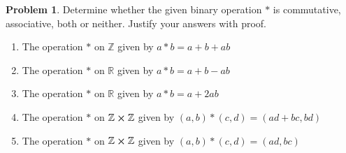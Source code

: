 \documentclass[10pt]{article}
\theoremstyle{definition}
\newtheorem{problem}{Problem}
\begin{document}
\begin{problem}
Determine whether the given binary operation $*$ is commutative,
associative, both or neither. Justify your answers with proof.
\begin{enumerate}[label=(\alph*)]
  \item The operation $*$ on $\mathbb{Z}$ given by $a*b=a+b+ab$
  \item The operation $*$ on $\mathbb{R}$ given by $a*b=a+b-ab$
  \item The operation $*$ on $\mathbb{R}$ given by $a*b=a+2ab$
  \item The operation $*$ on $\mathbb{Z}\cross\mathbb{Z}$ given by $(a,b)*(c,d)=(ad+bc, bd)$
  \item The operation $*$ on $\mathbb{Z}\cross\mathbb{Z}$ given by $(a,b)*(c,d)=(ad,bc)$
\end{enumerate}
\end{problem}
\end{document}
